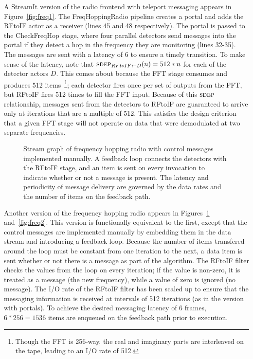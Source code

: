A StreamIt version of the radio frontend with teleport messaging
appears in Figure~\ref{fig:freq1}.  The FreqHoppingRadio pipeline
creates a portal and adds the RFtoIF actor as a receiver (lines 45 and
48 respectively).  The portal is passed to the CheckFreqHop stage,
where four parallel detectors send messages into the portal if they
detect a hop in the frequency they are monitoring (lines 32-35).  The
messages are sent with a latency of 6 to ensure a timely transition.
To make sense of the latency, note that $\textsc{sdep}_{RFtoIF \small{\leftarrow} D}(n) = 512*n$
for each of the detector actors $D$.  This comes about because the FFT
stage consumes and produces 512 items~\footnote{Though the FFT is
  256-way, the real and imaginary parts are interleaved on the tape,
  leading to an I/O rate of 512.}; each detector fires once per set of
outputs from the FFT, but RFtoIF fires 512 times to fill the FFT
input.  Because of this $\textsc{sdep}$ relationship, messages sent from the
detectors to RFtoIF are guaranteed to arrive only at iterations that
are a multiple of 512.  This satisfies the design criterion that a
given FFT stage will not operate on data that were demodulated at two
separate frequencies.

\begin{figure}[t]
\centering
{}
\caption[Stream graph of frequency hopping radio with manual control
  messages]{Stream graph of frequency hopping radio with control
  messages implemented manually.  A feedback loop connects the
  detectors with the RFtoIF stage, and an item is sent on every
  invocation to indicate whether or not a message is present.  The
  latency and periodicity of message delivery are governed by the data
  rates and the number of items on the feedback
  path. \protect\label{fig:fhr-manual}}
\end{figure}

Another version of the frequency hopping radio appears in
Figures~\ref{fig:fhr-manual} and~\ref{fig:freq2}.  This version is
functionally equivalent to the first, except that the control messages
are implemented manually by embedding them in the data stream and
introducing a feedback loop.  Because the number of items transfered
around the loop must be constant from one iteration to the next, a
data item is sent whether or not there is a message as part of the
algorithm.  The RFtoIF filter checks the values from the loop on every
iteration; if the value is non-zero, it is treated as a message (the
new frequency), while a value of zero is ignored (no message).  The
I/O rate of the RFtoIF filter has been scaled up to ensure that the
messaging information is received at intervals of 512 iterations (as
in the version with portals).  To achieve the desired messaging
latency of 6 frames, $6*256 = 1536$ items are enqueued on the feedback
path prior to execution.

